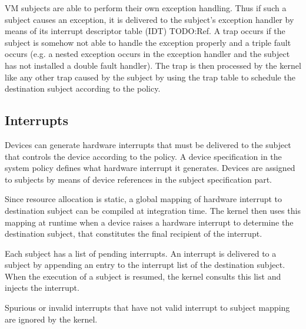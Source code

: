 VM subjects are able to perform their own exception handling. Thus if such a
subject causes an exception, it is delivered to the subject's exception handler
by means of its interrupt descriptor table (IDT) TODO:Ref. A trap occurs if the
subject is somehow not able to handle the exception properly and a triple fault
occurs (e.g. a nested exception occurs in the exception handler and the subject
has not installed a double fault handler).
The trap is then processed by the kernel like any other trap caused by the
subject by using the trap table to schedule the destination subject according to
the policy.

\subsection{Interrupts}
Devices can generate hardware interrupts that must be delivered to the subject
that controls the device according to the policy. A device specification in the
system policy defines what hardware interrupt it generates. Devices are assigned
to subjects by means of device references in the subject specification part.

Since resource allocation is static, a global mapping of hardware interrupt to
destination subject can be compiled at integration time. The kernel then uses
this mapping at runtime when a device raises a hardware interrupt to determine
the destination subject, that constitutes the final recipient of the interrupt.

Each subject has a list of pending interrupts. An interrupt is delivered to a
subject by appending an entry to the interrupt list of the destination subject.
When the execution of a subject is resumed, the kernel consults this list and
injects the interrupt.

Spurious or invalid interrupts that have not valid interrupt to subject mapping
are ignored by the kernel.


